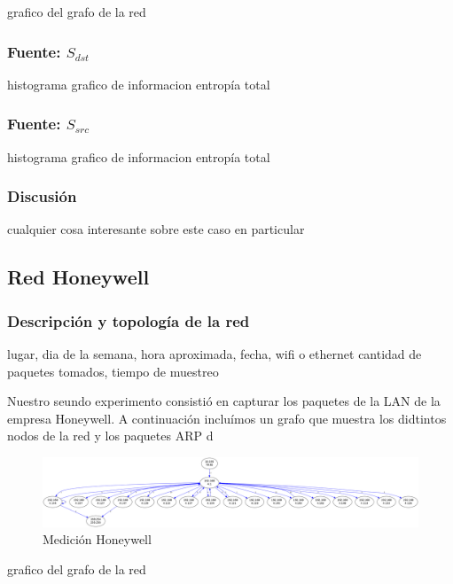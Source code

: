 \documentclass[10pt, a4paper]{article}
\begin{document}
grafico del grafo de la red

\subsubsection{Fuente: $S_{dst}$}

histograma
grafico de informacion
entropía total

\subsubsection{Fuente: $S_{src}$}

histograma
grafico de informacion
entropía total

\subsubsection{Discusión}

cualquier cosa interesante sobre este caso en particular

\subsection{Red Honeywell}

\subsubsection{Descripción y topología de la red}

lugar, dia de la semana, hora aproximada, fecha, wifi o ethernet
cantidad de paquetes tomados, tiempo de muestreo

Nuestro seundo experimento consistió en capturar los paquetes de la LAN de la empresa Honeywell. A continuación incluímos un grafo que muestra los didtintos nodos de la red y los paquetes ARP d
 
\begin{figure}
 \begin{center}
  \includegraphics[width=\linewidth]{../imgs/prueba_laburo-ips_red.png}
  \caption{Medición Honeywell}
 \end{center}
\end{figure}

grafico del grafo de la red
\end{document}
